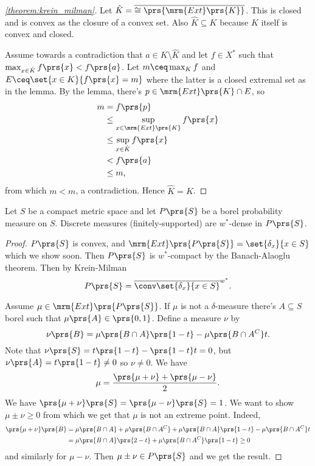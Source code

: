 \documentclass[10pt, twoside]{book}
\begin{document}
\begin{proof}[\ref{theorem:krein_milman}]
Let $\hat{K} = \overline{\cong\prs{\mrm{Ext}\prs{K}}}$. This is closed and is convex as the closure of a convex set. Also $\hat{K} \subseteq K$ because $K$ itself is convex and closed.

Assume towards a contradiction that $a \in K \setminus \hat{K}$ and let $f \in X^*$ such that $\max_{x \in \hat{K}} f\prs{x} < f\prs{a}$.
Let $m \ceq \max_K f$ and $E \ceq \set{x \in K}{f\prs{x} = m}$ where the latter is a closed extremal set as in the lemma.
By the lemma, there's $p \in \mrm{Ext}\prs{K} \cap E$, so
\begin{align*}
m &= f\prs{p}
\\&\leq \sup_{x \in \mrm{Ext}\prs{K}} f\prs{x}
\\&\leq \sup_{x \in \hat{K}} f\prs{x}
\\&< f\prs{a}
\\&\leq m \text{,}
\end{align*}
from which $m < m$, a contradiction. Hence $\hat{K} = K$.
\end{proof}

\begin{example}
Let $S$ be a compact metric space and let $P\prs{S}$ be a borel probability measure on $S$.
Discrete measures (finitely-supported) are $w^*$-dense in $P\prs{S}$.
\end{example}

\begin{proof}
$P\prs{S}$ is convex, and $\mrm{Ext}\prs{P\prs{S}} = \set{\delta_x}{x \in S}$ which we show soon.
Then $P\prs{S}$ is $w^*$-compact by the Banach-Alaoglu theorem. Then by Krein-Milman
\[P\prs{S} = \overline{\conv\set{\delta_x}{x \in S}}^{w^*} \text{.}\]

Assume $\mu \in \mrm{Ext}\prs{P\prs{S}}$. If $\mu$ is not a $\delta$-measure there's $A \subseteq S$ borel such that $\mu\prs{A} \in \prs{0,1}$. Define a measure $\nu$ by
\[\nu\prs{B} = \mu\prs{B \cap A} \prs{1-t} - \mu\prs{B \cap A^C} t \text{.}\]
Note that $\nu\prs{S} = t\prs{1-t} - \prs{1-t}t = 0$, but $\nu\prs{A} = t \prs{1-t} \neq 0$ so $\nu\neq 0$.
We have
\[\mu = \frac{\prs{\mu + \nu} + \prs{\mu - \nu}}{2} \text{.}\]
We have $\prs{\mu + \nu}\prs{S} = \prs{\mu - \nu}\prs{S} = 1$. We want to show $\mu \pm \nu \geq 0$ from which we get that $\mu$ is not an extreme point.
Indeed,
\begin{align*}
\prs{\mu + \nu}\prs{B} &= \mu\prs{B \cap A} + \mu\prs{B \cap A^C} + \mu\prs{B \cap A} \prs{1-t} - \mu\prs{B \cap A^C} t \\&=
\mu\prs{B \cap A} \prs{2-t} + \mu\prs{B \cap A^C} \prs{1-t} \geq 0
\end{align*}
and similarly for $\mu - \nu$. Then $\mu \pm \nu \in P\prs{S}$ and we get the result.
\end{proof}
\end{document}
